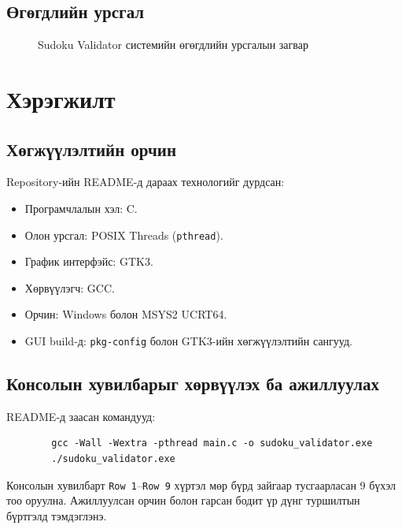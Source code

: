 \documentclass[12pt,a4paper]{report}
\begin{document}
	\section{Өгөгдлийн урсгал}
	\begin{figure}[H]
		\centering
		\caption{Sudoku Validator системийн өгөгдлийн урсгалын загвар}
	\end{figure}
	
	\chapter{Хэрэгжилт}
	
	\section{Хөгжүүлэлтийн орчин}
	Repository-ийн README-д дараах технологийг дурдсан:
	\begin{itemize}
		\item Програмчлалын хэл: C.
		\item Олон урсгал: POSIX Threads (\texttt{pthread}).
		\item График интерфэйс: GTK3.
		\item Хөрвүүлэгч: GCC.
		\item Орчин: Windows болон MSYS2 UCRT64.
		\item GUI build-д: \texttt{pkg-config} болон GTK3-ийн хөгжүүлэлтийн сангууд.
	\end{itemize}
	
	\section{Консолын хувилбарыг хөрвүүлэх ба ажиллуулах}
	README-д заасан командууд:
	\begin{lstlisting}
		gcc -Wall -Wextra -pthread main.c -o sudoku_validator.exe
		./sudoku_validator.exe
	\end{lstlisting}
	Консолын хувилбарт \texttt{Row 1}--\texttt{Row 9} хүртэл мөр бүрд зайгаар тусгаарласан 9 бүхэл тоо оруулна. Ажиллуулсан орчин болон гарсан бодит үр дүнг туршилтын бүртгэлд тэмдэглэнэ.
	
\end{document}
